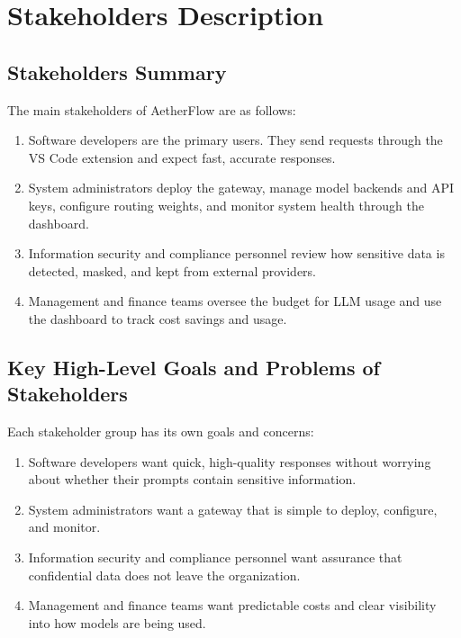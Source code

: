 \section{Stakeholders Description}
\label{sec:stakeholders}

\subsection{Stakeholders Summary}
\label{subsec:stakeholder-summary}

The main stakeholders of AetherFlow are as follows:

\begin{enumerate}
    \item Software developers are the primary users. They send requests through the VS Code extension and expect fast, accurate responses.
    \item System administrators deploy the gateway, manage model backends and API keys, configure routing weights, and monitor system health through the dashboard.
    \item Information security and compliance personnel review how sensitive data is detected, masked, and kept from external providers.
    \item Management and finance teams oversee the budget for LLM usage and use the dashboard to track cost savings and usage.
\end{enumerate}

\subsection{Key High-Level Goals and Problems of Stakeholders}
\label{subsec:stakeholder-goals}

Each stakeholder group has its own goals and concerns:

\begin{enumerate}
    \item Software developers want quick, high-quality responses without worrying about whether their prompts contain sensitive information.
    \item System administrators want a gateway that is simple to deploy, configure, and monitor.
    \item Information security and compliance personnel want assurance that confidential data does not leave the organization.
    \item Management and finance teams want predictable costs and clear visibility into how models are being used.
\end{enumerate}

